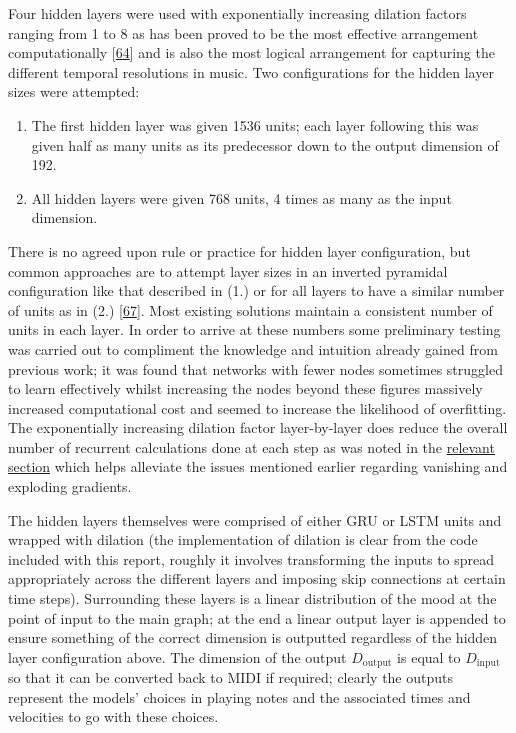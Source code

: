 \documentclass[12pt,]{article}
\providecommand{\tightlist}{%
  \setlength{\itemsep}{0pt}\setlength{\parskip}{0pt}}
\begin{document}
Four hidden layers were used with exponentially increasing dilation
factors ranging from 1 to 8 as has been proved to be the most effective
arrangement computationally
{[}\protect\hyperlink{ref-chang2017dilated}{64}{]} and is also the most
logical arrangement for capturing the different temporal resolutions in
music. Two configurations for the hidden layer sizes were attempted:

\begin{enumerate}
\def\labelenumi{\arabic{enumi}.}
\tightlist
\item
  The first hidden layer was given 1536 units; each layer following this
  was given half as many units as its predecessor down to the output
  dimension of 192.
\item
  All hidden layers were given 768 units, 4 times as many as the input
  dimension.
\end{enumerate}

There is no agreed upon rule or practice for hidden layer configuration,
but common approaches are to attempt layer sizes in an inverted
pyramidal configuration like that described in (1.) or for all layers to
have a similar number of units as in (2.)
{[}\protect\hyperlink{ref-doi10108001431160802549278}{67}{]}. Most
existing solutions maintain a consistent number of units in each layer.
In order to arrive at these numbers some preliminary testing was carried
out to compliment the knowledge and intuition already gained from
previous work; it was found that networks with fewer nodes sometimes
struggled to learn effectively whilst increasing the nodes beyond these
figures massively increased computational cost and seemed to increase
the likelihood of overfitting. The exponentially increasing dilation
factor layer-by-layer does reduce the overall number of recurrent
calculations done at each step as was noted in the
\protect\hyperlink{dilation}{relevant section} which helps alleviate the
issues mentioned earlier regarding vanishing and exploding gradients.

The hidden layers themselves were comprised of either GRU or LSTM units
and wrapped with dilation (the implementation of dilation is clear from
the code included with this report, roughly it involves transforming the
inputs to spread appropriately across the different layers and imposing
skip connections at certain time steps). Surrounding these layers is a
linear distribution of the mood at the point of input to the main graph;
at the end a linear output layer is appended to ensure something of the
correct dimension is outputted regardless of the hidden layer
configuration above. The dimension of the output \(D_{\text{output}}\)
is equal to \(D_{\text{input}}\) so that it can be converted back to
MIDI if required; clearly the outputs represent the models' choices in
playing notes and the associated times and velocities to go with these
choices.
\end{document}
